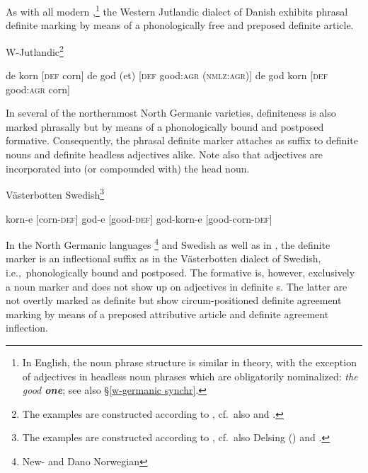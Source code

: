 {As with all modern ,\footnote{In English, the noun phrase structure is similar in theory, with the exception of adjectives in headless noun phrases which are obligatorily nominalized: \textit{the good \textbf{one}}; see also \S\ref{w-germanic synchr}.} the Western Jutlandic dialect of Danish exhibits phrasal definite marking by means of a phonologically free and preposed definite article.
\begin{exe}
\ex \rm{W-Jutlandic}\footnote{The examples are constructed according to \citet{lund1932}, cf.~also \citet[121–122]{delsing1993} and \citet{dahl2003}.}
\begin{xlist}
\ex de korn \rm{[\textsc{def} corn]}
\ex de god (et) \rm{[\textsc{def} good:\textsc{agr} (\textsc{nmlz:agr})]}
\ex de god korn \rm{[\textsc{def} good:\textsc{agr} corn]}
\end{xlist}
\end{exe}
In several of the northernmost North Germanic varieties, definiteness is also marked phrasally but by means of a phonologically bound and postposed formative. Consequently, the phrasal definite marker attaches as suffix to definite nouns and definite headless adjectives alike. Note also that adjectives are incorporated into (or compounded with) the head noun. 
\begin{exe}
\ex \rm{Västerbotten Swedish}\footnote{The examples are constructed according to \citet{astrom1893}, cf.~also Delsing (\citeyear[122–123]{delsing1993}) and \cite{dahl2003}.}
\begin{xlist}
\ex korn-e \rm{[corn-\textsc{def}]}
\ex god-e \rm{[good-\textsc{def}]}
\ex god-korn-e \rm{[good-corn-\textsc{def}]}
\end{xlist}
\end{exe}
In the North Germanic languages \footnote{New- and Dano Norwegian} and Swedish as well as in , the definite marker is an inflectional suffix as in the Västerbotten dialect of Swedish, i.e.,~phonologically bound and postposed. The formative is, however, exclusively a noun marker and does not show up on adjectives in definite s. The latter are not overtly marked as definite but show circum-positioned definite agreement marking by means of a preposed attributive article and definite agreement inflection.
}
